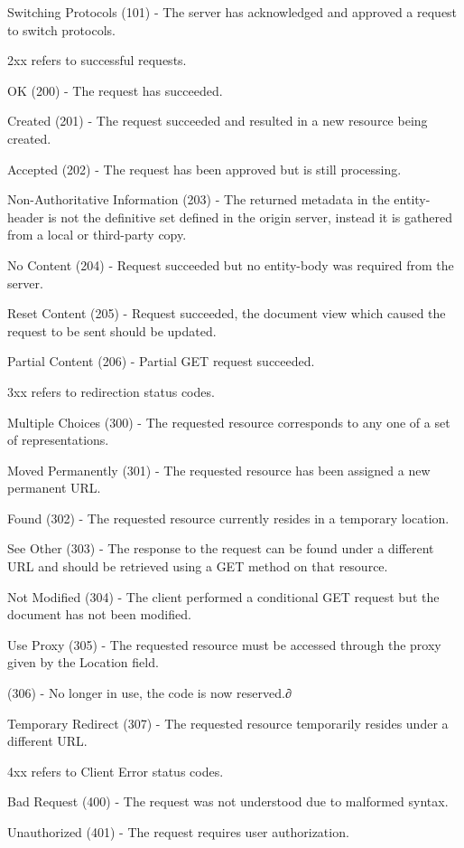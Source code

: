 \documentclass[titlepage]{article}
\begin{document}
Switching Protocols (101) - The server has acknowledged and approved a request to switch protocols.

2xx refers to successful requests.

OK (200) - The request has succeeded.

Created (201) - The request succeeded and resulted in a new resource being created.

Accepted (202) - The request has been approved but is still processing.

Non-Authoritative Information (203) - The returned metadata in the entity-header is not the definitive set defined in the origin server, instead it is gathered from a local or third-party copy.

No Content (204) - Request succeeded but no entity-body was required from the server.

Reset Content (205) - Request succeeded, the document view which caused the request to be sent should be updated.

Partial Content (206) - Partial GET request succeeded.

3xx refers to redirection status codes.

Multiple Choices (300) - The requested resource corresponds to any one of a set of representations.

Moved Permanently (301) - The requested resource has been assigned a new permanent URL.

Found (302) - The requested resource currently resides in a temporary location.

See Other (303) - The response to the request can be found under a different URL and should be retrieved using a GET method on that resource.

Not Modified (304) - The client performed a conditional GET request but the document has not been modified.

Use Proxy (305) - The requested resource must be accessed through the proxy given by the Location field.

(306) - No longer in use, the code is now reserved.∂

Temporary Redirect (307) - The requested resource temporarily resides under a different URL.

4xx refers to Client Error status codes.

Bad Request (400) - The request was not understood due to malformed syntax.

Unauthorized (401) - The request requires user authorization.
\end{document}
